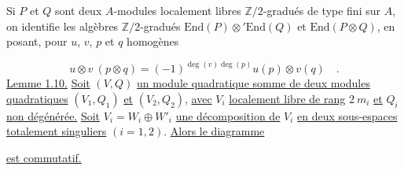 Si $P$ et $Q$ sont deux $A$-modules localement libres $\mathbb{Z}/2$-gradués de type fini sur $A$, on identifie les algèbres $\mathbb{Z}/2$-gradués $\mathrm{End}(P) \otimes' \mathrm{End}(Q)$ et $\mathrm{End}(P \otimes Q)$, en posant, pour $u$, $v$, $p$ et $q$ homogènes

\begin{equation*}
u \otimes v\ (p \otimes q) = (-1)^{\deg(v)\deg(p)} u(p) \otimes v(q) \quad .
\end{equation*}
\underline{Lemme 1.10.} \underline{Soit} $(V,Q)$ \underline{un module quadratique somme de deux modules quadratiques} $(V_1, Q_1)$ \underline{et} $(V_2, Q_2)$, \underline{avec} $V_i$ \underline{localement libre de rang} $2\ m_i$ \underline{et} $Q_i$ \underline{non dégénérée.} \underline{Soit} $V_i = W_i \oplus W'_i$ \underline{une décomposition de} $V_i$ \underline{en deux sous-espaces totalement singuliers} $(i = 1, 2)$. \underline{Alors le diagramme}

\begin{center}
\end{center}
\underline{est commutatif.}


